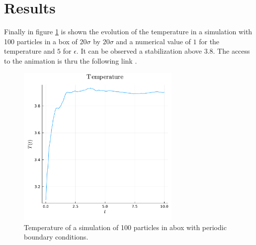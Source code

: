\documentclass[main.tex]{subfiles}
\begin{document}
\section{Results}

Finally in figure \ref{fig:temperature} is shown the evolution of the temperature in a simulation with 100 particles in a box of $20\sigma$ by $20\sigma$ and a numerical value of $1$ for the temperature and $5$ for $\epsilon$.
It can be observed a stabilization above \num{3.8}.
The access to the animation is thru the following link \href{https://tecmx-my.sharepoint.com/:i:/g/personal/a00827546_tec_mx/EZXD87BSJGRDgFDDatIbGIgBjRzCqsQQtKEvOHwzOpqipg?email=leogabac%40tec.mx&e=McEIBo}{\color{blue}{Access to the animation}}.

\begin{figure}[ht]
    \centering
    \includegraphics[width=0.7\textwidth]{imgs/hw2/100TempPlotPBC3.pdf}
    \caption{Temperature of a simulation of 100 particles in abox with periodic boundary conditions.}
    \label{fig:temperature}
\end{figure}
\end{document}
